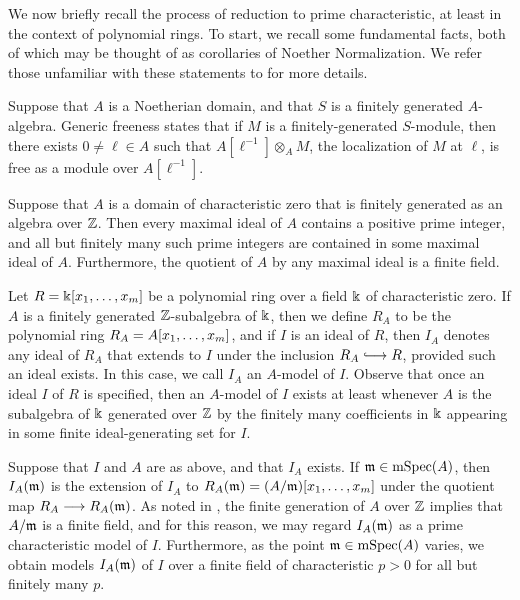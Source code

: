 \documentclass[11pt]{amsart}
\newcommand{\hooklongrightarrow}{\lhook\joinrel\longrightarrow}
\newcommand{\mspec}{\operatorname{mSpec}}
\begin{document}
We now briefly recall the process of reduction to prime characteristic, at least in the context of polynomial rings.  To start, we recall some fundamental facts, both of which may be thought of as corollaries of Noether Normalization.  We refer those unfamiliar with these statements to \cite[Chapter 3]{hernandez.thesis} for more details.

\begin{remark} \label{generic-freeness} Suppose that $A$ is a Noetherian domain,  and that $S$ is a finitely generated $A$-algebra.  Generic freeness states that if $M$ is a finitely-generated $S$-module, then there exists  $0 \neq \ell \in A$ such that $A[\ell^{-1}] \otimes_A M$, the localization of $M$ at $\ell$, is free as a module over $A[\ell^{-1}]$.
\end{remark}

\begin{remark}
   \label{maximal ideals: R}
   Suppose that $A$ is a domain of characteristic zero that is finitely generated as an algebra over $\mathbb{Z}$.  Then every maximal ideal of $A$ contains a positive prime integer, and all but finitely many such prime integers are contained in some maximal ideal of $A$.  Furthermore, the quotient of $A$ by any maximal ideal is a finite field. 
\end{remark}

\begin{remark}
   \label{reduction: R}
   Let $R = \Bbbk[x_1, \ldots, x_m]$ be a polynomial ring over a field $\Bbbk$ of characteristic zero.
   If $A$ is a finitely generated $\mathbb{Z}$-subalgebra of $\Bbbk$, then we define $R_A$ to be the polynomial ring $R_A=A[x_1, \ldots, x_m]$, and if $I$ is an ideal of $R$, then $I_A$ denotes any ideal of $R_A$ that extends to $I$ under the inclusion $R_A \hooklongrightarrow R$, provided such an ideal exists.  In this case, we call $I_A$ an $A$-model of $I$.
   Observe that once an ideal $I$ of $R$ is specified, then an $A$-model of $I$ exists at least whenever $A$ is the subalgebra of $\Bbbk$ generated over $\mathbb{Z}$ by the finitely many coefficients in $\Bbbk$ appearing in some finite ideal-generating set for $I$.

   Suppose that $I$ and $A$ are as above, and that $I_A$ exists.
   If $\maxi \in \mspec(A)$, then $I_A(\mathfrak{m})$ is the extension of $I_A$ to $R_{A}(\mathfrak{m})= (A/\mathfrak{m})[x_1, \ldots, x_m]$ under the quotient map $R_A \longrightarrow R_A(\mathfrak{m})$.
   As noted in , the finite generation of $A$ over $\mathbb{Z}$ implies that $A/\mathfrak{m}$ is a finite field, and for this reason, we may regard $I_A(\mathfrak{m})$ as a prime characteristic model of $I$.   Furthermore, as the point $\maxi \in \mspec(A)$ varies, we obtain models $I_A(\mathfrak{m})$ of $I$ over a finite field of characteristic $p>0$ for all but finitely many $p$.
\end{remark}
\end{document}
